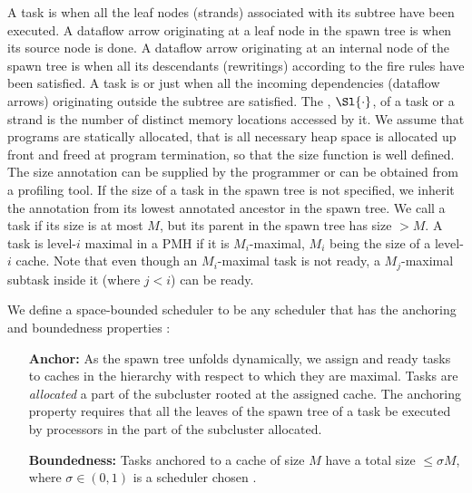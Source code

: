 A task is  when all the leaf nodes (strands) associated with
its subtree have been executed.  A dataflow arrow originating at a leaf
node in the spawn tree is  when its source node is done.
A dataflow arrow originating at an internal node of the spawn tree is
 when all its descendants (rewritings) according to the
fire rules have been satisfied.  
A task is  or just  when all the
incoming dependencies (dataflow arrows) originating outside the
subtree are satisfied.  The , $\Sl{\cdot}$, of a task or a
strand is the number of distinct memory locations accessed by it.  We
assume that programs are statically allocated, that is all necessary
heap space is allocated up front and freed at program termination, so
that the size function is well defined. The size annotation can be
supplied by the programmer or can be obtained from a profiling
tool. If the size of a task in the spawn tree is not specified, we
inherit the annotation from its lowest annotated ancestor in the spawn
tree. We call a task  if its size is at most $M$,
but its parent in the spawn tree has size $>M$. A task is level-$i$
maximal in a PMH if it is $M_i$-maximal, $M_i$ being the size of a
level-$i$ cache. Note that even though an $M_i$-maximal task is not
ready, a $M_j$-maximal subtask inside it (where $j<i$) can be ready.

\vspace{1ex}
We define a space-bounded scheduler to be any scheduler that has the
anchoring and boundedness properties \cite{SimhadriBlFi15}:
\begin{itemize}
\item[\textbf{Anchor:}]
As the spawn tree unfolds dynamically, we assign and 
ready tasks to caches in the hierarchy with respect to which they are
maximal.  Tasks are \textit{allocated} a part of the subcluster rooted
at the assigned cache. The anchoring property requires that all the
leaves of the spawn tree of a task be executed by processors in the
part of the subcluster allocated.
\item[\textbf{Boundedness:}]
 Tasks anchored to a cache of size $M$ have a total size $\leq\sigma M$,
where $\sigma\in(0,1)$ is a scheduler chosen .
\end{itemize}

